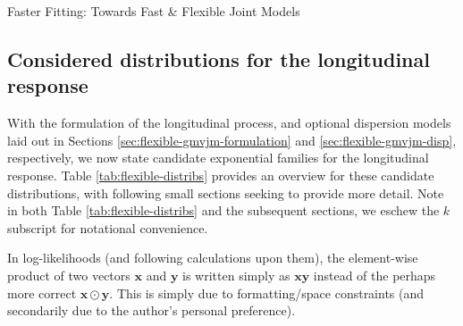 \begin{chapter}{\label{cha:flexible}Faster Fitting: Towards Fast \& Flexible Joint Models}
\subsection{Considered distributions for the longitudinal response}\label{sec:flexible-gmvjm-distribs}
\rmtoc
With the formulation of the longitudinal process, and optional dispersion models laid out in Sections \ref{sec:flexible-gmvjm-formulation} and \ref{sec:flexible-gmvjm-disp}, respectively, we now state candidate exponential families for the longitudinal response. Table \ref{tab:flexible-distribs} provides an overview for these candidate distributions, with following small sections seeking to provide more detail. Note in both Table \ref{tab:flexible-distribs} and the subsequent sections, we eschew the $k$ subscript for notational convenience.

\begin{remark}
    In log-likelihoods (and following calculations upon them), the element-wise product of two vectors $\bm{x}$ and $\bm{y}$ is written simply as $\bm{x}\bm{y}$ instead of the perhaps more correct $\bm{x}\odot\bm{y}$. This is simply due to formatting/space constraints (and secondarily due to the author's personal preference).
\end{remark}


\end{chapter}
